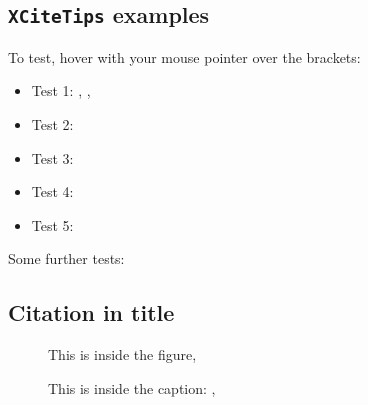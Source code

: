 \documentclass[11pt,a4paper,twocolumn]{article}
\begin{document}
\subsection*{\texttt{XCiteTips} examples
\cite[using refs:][]{Misner:1974qy,Wigner:1939cj,Weinberg:1995mt}}

To test, hover with your mouse pointer over the brackets:

\begin{itemize}
  \item Test 1: \cite{Misner:1974qy}, \cite{Wigner:1939cj}, 
  \cite{Weinberg:1995mt}
  \item Test 2: \cite{Misner:1974qy,Wigner:1939cj,Weinberg:1995mt}
  \item Test 3: \cite[post]{Misner:1974qy,Wigner:1939cj,Weinberg:1995mt}
  \item Test 4: \cite[pre][post]{Misner:1974qy,Wigner:1939cj,Weinberg:1995mt}
  \item Test 5: \cite[pre][]{Misner:1974qy,Weinberg:1995mt}
\end{itemize}

\noindent Some further tests:

\subsection*{Citation \cite{Misner:1974qy,Wigner:1939cj,Weinberg:1995mt} in 
title}

\begin{figure}[H]
  This is inside the figure, \cite{Misner:1974qy} 
  \caption{This is inside the caption: \cite{Misner:1974qy} 
  , 
  \cite{Misner:1974qy,Wigner:1939cj,Weinberg:1995mt}}
\end{figure}



\end{document}
